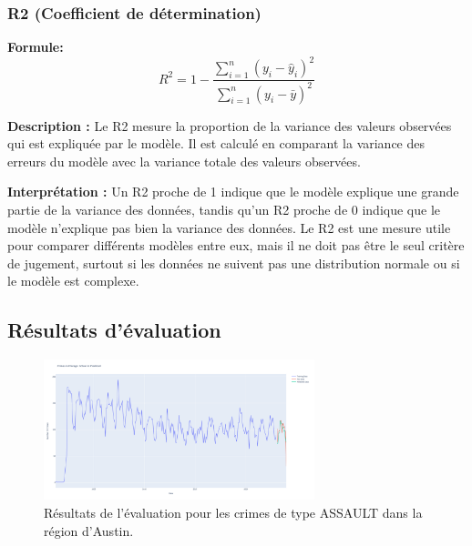 \documentclass[12pt]{article}
\begin{document}
\subsubsection{R2 (Coefficient de détermination)}

\textbf{Formule:} 
\[ R^2 = 1 - \frac{\sum_{i=1}^{n} (y_i - \hat{y}_i)^2}{\sum_{i=1}^{n} (y_i - \bar{y})^2} \]

\textbf{Description :} Le R2 mesure la proportion de la variance des valeurs observées qui est expliquée par le modèle. Il est calculé en comparant la variance des erreurs du modèle avec la variance totale des valeurs observées.

\textbf{Interprétation :} Un R2 proche de 1 indique que le modèle explique une grande partie de la variance des données, tandis qu'un R2 proche de 0 indique que le modèle n'explique pas bien la variance des données. Le R2 est une mesure utile pour comparer différents modèles entre eux, mais il ne doit pas être le seul critère de jugement, surtout si les données ne suivent pas une distribution normale ou si le modèle est complexe.


\subsection{Résultats d’évaluation}

\begin{figure}[htbp]
	\centering
	\includegraphics[width=0.7\textwidth]{figure_Assault_Austin.png}
	\caption{Résultats de l'évaluation pour les crimes de type ASSAULT dans la région d'Austin.}
	\label{fig:assault_austin}
\end{figure}
\end{document}
